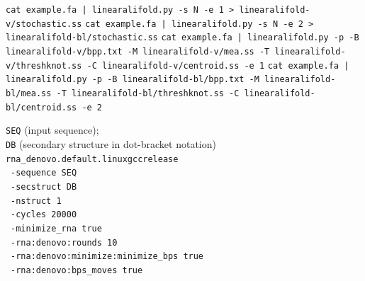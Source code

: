 \documentclass[%
aip,
 amsmath,amssymb,
reprint,%
onecolumn,
]{revtex4-1}
\begin{document}
{\begin{algorithm}[H]
\begin{algorithmic}[1]
    \STATE \texttt{cat example.fa | linearalifold.py -s N -e 1 > linearalifold-v/stochastic.ss}
    \STATE \texttt{cat example.fa | linearalifold.py -s N -e 2 > linearalifold-bl/stochastic.ss}
    \STATE \texttt{cat example.fa | linearalifold.py -p -B linearalifold-v/bpp.txt -M linearalifold-v/mea.ss -T linearalifold-v/threshknot.ss -C linearalifold-v/centroid.ss -e 1}
    \STATE \texttt{cat example.fa | linearalifold.py -p -B linearalifold-bl/bpp.txt -M linearalifold-bl/mea.ss -T linearalifold-bl/threshknot.ss -C linearalifold-bl/centroid.ss -e 2}
  \end{algorithmic}
\end{algorithm}

\begin{algorithm}[H]
  \caption{Conformational Sampling with FARFAR2}
  \label{alg:rna_denovo}
  \begin{algorithmic}[1]
  \REQUIRE \texttt{SEQ} (input sequence);\\
  \texttt{DB} (secondary structure in dot-bracket notation)
    \STATE \texttt{rna\_denovo.default.linuxgccrelease} \\
    \ \texttt{-sequence SEQ}  \\
    \ \texttt{-secstruct DB} \\
    \ \texttt{-nstruct 1} \\
    \ \texttt{-cycles 20000} \\
    \ \texttt{-minimize\_rna true} \\
    \ \texttt{-rna:denovo:rounds 10} \\
    \ \texttt{-rna:denovo:minimize:minimize\_bps true} \\
    \ \texttt{-rna:denovo:bps\_moves true}
  \end{algorithmic}
\end{algorithm}

}
\end{document}
